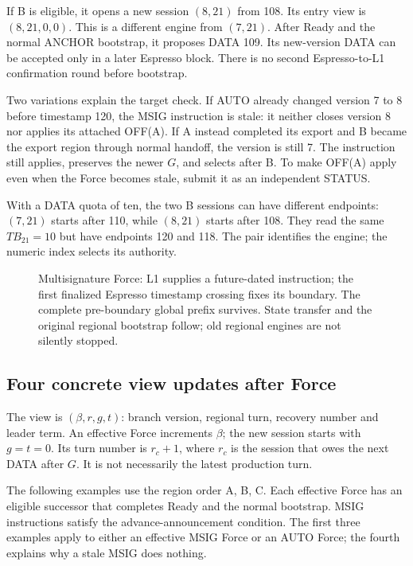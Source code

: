 \documentclass[11pt,a4paper]{article}
\newcommand{\TB}{\mathit{TB}}
\begin{document}
If B is eligible, it opens a new session $(8,21)$ from 108. Its entry
view is $(8,21,0,0)$. This is a different engine from $(7,21)$.
After Ready and the normal ANCHOR bootstrap, it proposes DATA 109.
Its new-version DATA can be accepted only in a later Espresso block.
There is no second Espresso-to-L1 confirmation round before bootstrap.

Two variations explain the target check. If AUTO already changed
version 7 to 8 before timestamp 120, the MSIG instruction is stale:
it neither closes version 8 nor applies its attached OFF(A). If A
instead completed its export and B became the export region through
normal handoff, the version is still 7. The instruction still applies,
preserves the newer $G$, and selects after B. To make OFF(A) apply even
when the Force becomes stale, submit it as an independent STATUS.

With a DATA quota of ten, the two B sessions can have different
endpoints: $(7,21)$ starts after 110, while $(8,21)$ starts after 108.
They read the same $\TB_{21}=10$ but have endpoints 120 and 118.
The pair identifies the engine; the numeric index selects its authority.

\begin{figure}[htbp]\centering

\caption{Multisignature Force: L1 supplies a future-dated instruction;
the first finalized Espresso timestamp crossing fixes its boundary.
The complete pre-boundary global prefix survives. State transfer and
the original regional bootstrap follow; old regional engines are not
silently stopped.}
\label{fig:forced-cross-region}
\end{figure}

\FloatBarrier
\subsection{Four concrete view updates after Force}
\label{sec:force-view-examples}
The view is $(\beta,r,g,t)$: branch version, regional turn,
recovery number and leader term. An effective Force increments $\beta$;
the new session starts with $g=t=0$. Its turn number is $r_c+1$, where
$r_c$ is the session that owes the next DATA after $G$. It is not
necessarily the latest production turn.

The following examples use the region order A, B, C. Each effective
Force has an eligible successor that completes Ready and the normal
bootstrap. MSIG instructions satisfy the advance-announcement condition.
The first three examples apply to either an effective MSIG Force or
an AUTO Force; the fourth explains why a stale MSIG does nothing.
\end{document}
